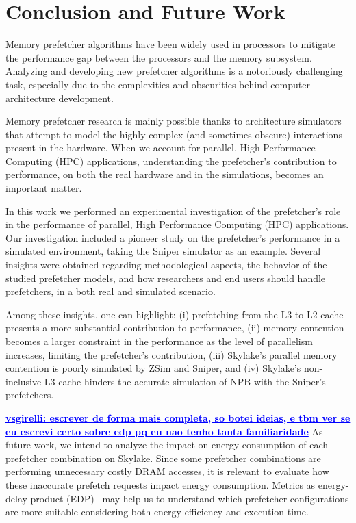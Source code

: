 \documentclass[AMA,final,STIX1COL]{WileyNJD-v2}
\newcommand{\vsg}[1]{\textcolor{blue}{\bfseries \ul{vsgirelli: #1} }\vspace{0.2cm}}
\begin{document}
\section{Conclusion and Future Work}\label{sec:conclusion}
Memory prefetcher algorithms have been widely used in processors to mitigate the performance gap between the processors and the memory subsystem. Analyzing and developing new prefetcher algorithms is a notoriously challenging task, especially due to the complexities and obscurities behind computer architecture development.

Memory prefetcher research is mainly possible thanks to architecture simulators that attempt to model the highly complex (and sometimes obscure) interactions present in the hardware. When we account for parallel, High-Performance Computing (HPC) applications, understanding the prefetcher's contribution to performance, on both the real hardware and in the simulations, becomes an important matter. 

In this work we performed an experimental investigation of the prefetcher's role in the performance of parallel, High Performance Computing (HPC) applications. Our investigation included a pioneer study on the prefetcher's performance in a simulated environment, taking the Sniper simulator as an example. Several insights were obtained regarding methodological aspects, the behavior of the studied prefetcher models, and how researchers and end users should handle prefetchers, in a both real and simulated scenario. 

Among these insights, one can highlight: (i) prefetching from the L3 to L2 cache presents a more substantial contribution to performance, (ii) memory contention becomes a larger constraint in the performance as the level of parallelism increases, limiting the prefetcher's contribution, (iii) Skylake's parallel memory contention is poorly simulated by ZSim and Sniper, and (iv) Skylake's non-inclusive L3 cache hinders the accurate simulation of NPB with the Sniper's prefetchers.




\vsg{escrever de forma mais completa, so botei ideias, e tbm ver se eu escrevi certo sobre edp pq eu nao tenho tanta familiaridade}
As future work, we intend to analyze the impact on energy consumption of each prefetcher combination on Skylake.
Since some prefetcher combinations are performing unnecessary costly DRAM accesses, it is relevant to evaluate how these inaccurate prefetch requests impact energy consumption.
Metrics as energy-delay product (EDP)~\cite{gonzalez1996edp} may help us to understand which prefetcher configurations are more suitable considering both energy efficiency and execution time.
\end{document}
